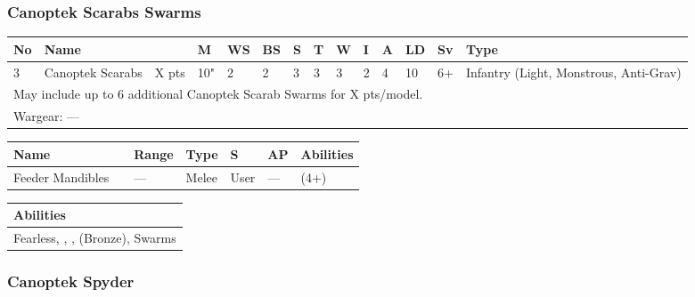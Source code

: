 \newpage
\subsubsection{Canoptek Scarabs Swarms}

\noindent
\begin{tabular}{||m{10pt} m{95pt} m{30pt} m{11pt} m{11pt} m{11pt} m{11pt} m{11pt} m{11pt} m{11pt} m{11pt} m{11pt} m{11pt} m{125pt}||}
	\hline
	No & Name & & M & WS & BS & S & T & W & I & A & LD & Sv & Type \\
	\hline
	3 & Canoptek Scarabs & X pts & 10" & 2 & 2 & 3 & 3 & 3 & 2 & 4 & 10 & 6+ & Infantry (Light, Monstrous, Anti-Grav)\\
	\hline
	\hline
	\multicolumn{14}{||Z{532 pt}||}{May include up to 6 additional Canoptek Scarab Swarms for X pts/model.}\\		
	\hline
	\hline
	\multicolumn{14}{||Z{532 pt}||}{Wargear: —}\\
	\hline
\end{tabular}

\noindent
\begin{tabular}{||m{110pt} m{30pt} m{31pt} m{55pt} m{12pt} m{12pt} m{210pt}||}
	\hline
	Name & & Range & Type & S & AP & Abilities \\
	\hline
	Feeder Mandibles & & — & Melee & User & — & \quickref{Entropic Strike} (4+) \\
	\hline
\end{tabular}

\noindent
\begin{tabular}{||m{532pt}||}
	\hline
	Abilities \\
	\hline
	Fearless, \quickref{Living Metal}, \quickref{Reanimation Protocols}, \quickref{Soulless Hordes} (Bronze), Swarms \\
	\hline
\end{tabular}


\newpage
\subsubsection{Canoptek Spyder}

